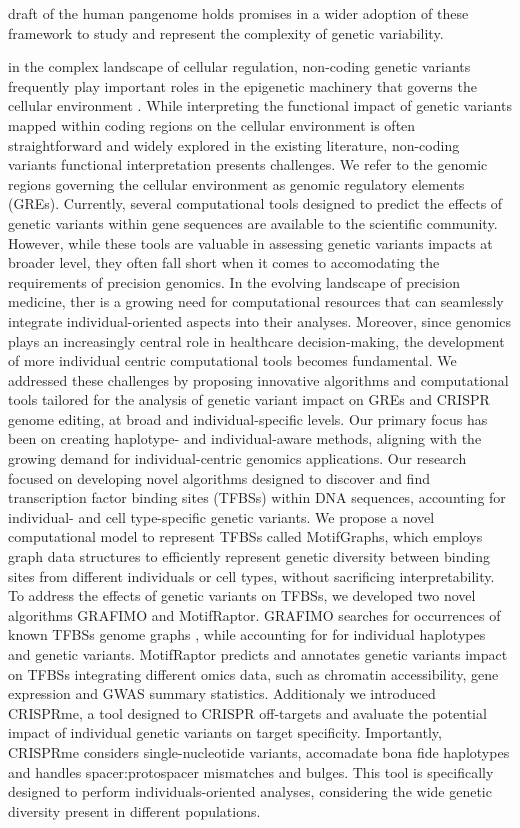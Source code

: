 \documentclass[a4paper, titlepage, openright]{book}
\newcommand{\grafimo}{GRAFIMO\xspace}
\newcommand{\crisprme}{CRISPRme\xspace}
\newcommand{\motifraptor}{MotifRaptor\xspace}
\begin{document}
draft of the human pangenome \citep{liao2023draft} holds promises in a wider adoption of these framework to study and represent the complexity of genetic variability.


in the complex landscape of cellular regulation, non-coding genetic variants frequently play important roles in the epigenetic machinery that governs the cellular environment \citep{maurano2012systematic}. While interpreting the functional impact of genetic variants mapped within coding regions on the cellular environment is often straightforward and widely explored in the existing literature, non-coding variants functional interpretation presents challenges.  We refer to the genomic regions governing the cellular environment as genomic regulatory elements (GREs). Currently, several computational tools designed to predict the effects of genetic variants within gene sequences are available to the scientific community.  However,  while these tools are valuable in assessing genetic variants impacts at broader level, they often fall short when it comes to accomodating the requirements of precision genomics.  In the evolving landscape of precision medicine, ther is a growing need for computational resources that can seamlessly  integrate individual-oriented aspects into their analyses.  Moreover, since genomics plays an increasingly central role in healthcare decision-making, the development of more individual centric computational tools becomes fundamental. We addressed these challenges by proposing innovative algorithms and computational tools tailored for the analysis of genetic variant impact on GREs and CRISPR genome editing, at broad and individual-specific levels. Our primary focus has been on creating haplotype- and individual-aware methods, aligning with the growing demand for individual-centric genomics applications.  Our research focused on developing novel algorithms designed to discover and find transcription factor binding sites (TFBSs) within DNA sequences, accounting for individual- and cell type-specific genetic variants.  We propose a novel computational model to represent TFBSs called MotifGraphs, which employs graph data structures to efficiently represent genetic diversity between binding sites from different individuals or cell types, without sacrificing interpretability.  To address the effects of genetic variants on TFBSs, we developed two novel algorithms \grafimo \citep{tognon2021grafimo} and \motifraptor \citep{yao2021motif}. \grafimo searches for occurrences of known TFBSs genome graphs \citep{paten2017genome}, while accounting for for individual haplotypes and genetic variants. \motifraptor predicts and annotates genetic variants impact on TFBSs integrating different omics data, such as chromatin accessibility, gene expression and GWAS summary statistics. Additionaly we introduced \crisprme \citep{cancellieri2023human}, a tool designed to CRISPR off-targets and avaluate the potential impact of individual genetic variants on target specificity.  Importantly,  \crisprme considers single-nucleotide variants, accomadate bona fide haplotypes and handles spacer:protospacer mismatches and bulges. This tool is specifically designed to perform individuals-oriented analyses, considering the wide genetic diversity present in different populations.
\end{document}
